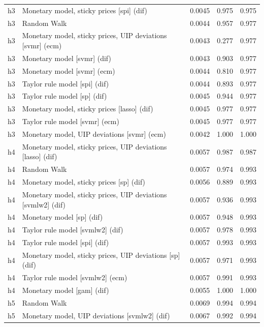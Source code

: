\begin{ThreePartTable}
\begin{longtable}[t]{cp{5.5cm}ccc}
h3 & \raggedright Monetary model, sticky prices [spi] (dif) & 0.0045 & 0.975 & 0.975\\
h3 & \raggedright Random Walk & 0.0044 & 0.957 & 0.977\\
h3 & \raggedright Monetary model, sticky prices, UIP deviations [svmr] (ecm) & 0.0043 & 0.277 & 0.977\\
h3 & \raggedright Monetary model [svmr] (dif) & 0.0043 & 0.903 & 0.977\\
h3 & \raggedright Monetary model [svmr] (ecm) & 0.0044 & 0.810 & 0.977\\
h3 & \raggedright Taylor rule model [spi] (dif) & 0.0044 & 0.893 & 0.977\\
h3 & \raggedright Taylor rule model [sp] (dif) & 0.0045 & 0.944 & 0.977\\
h3 & \raggedright Monetary model, sticky prices [lasso] (dif) & 0.0045 & 0.977 & 0.977\\
h3 & \raggedright Taylor rule model [svmr] (ecm) & 0.0045 & 0.977 & 0.977\\
h3 & \raggedright Monetary model, UIP deviations [svmr] (ecm) & 0.0042 & 1.000 & 1.000\\
\addlinespace
h4 & \raggedright Monetary model, sticky prices, UIP deviations [lasso] (dif) & 0.0057 & 0.987 & 0.987\\
h4 & \raggedright Random Walk & 0.0057 & 0.974 & 0.993\\
h4 & \raggedright Monetary model, sticky prices [sp] (dif) & 0.0056 & 0.889 & 0.993\\
h4 & \raggedright Monetary model, sticky prices, UIP deviations [svmlw2] (dif) & 0.0057 & 0.936 & 0.993\\
h4 & \raggedright Monetary model [sp] (dif) & 0.0057 & 0.948 & 0.993\\
h4 & \raggedright Taylor rule model [svmlw2] (dif) & 0.0057 & 0.978 & 0.993\\
h4 & \raggedright Taylor rule model [spi] (dif) & 0.0057 & 0.993 & 0.993\\
h4 & \raggedright Monetary model, sticky prices, UIP deviations [sp] (dif) & 0.0057 & 0.971 & 0.993\\
h4 & \raggedright Taylor rule model [svmlw2] (ecm) & 0.0057 & 0.991 & 0.993\\
h4 & \raggedright Monetary model [gam] (dif) & 0.0055 & 1.000 & 1.000\\
\addlinespace
h5 & \raggedright Random Walk & 0.0069 & 0.994 & 0.994\\
h5 & \raggedright Monetary model, UIP deviations [svmlw2] (dif) & 0.0067 & 0.992 & 0.994\\

\end{longtable}
\end{ThreePartTable}
